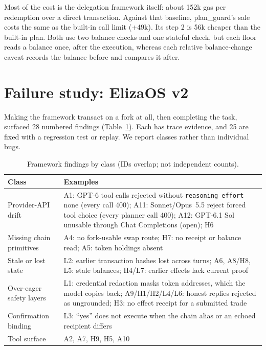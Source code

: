 \documentclass[conference]{IEEEtran}
\begin{document}
Most of the cost is the delegation framework itself: about 152k gas per redemption over a direct transaction. Against
that baseline, plan\_guard's sale costs the same as the built-in call limit (+49k). Its step 2 is 56k cheaper than
the built-in plan. Both use two balance checks and one stateful check, but each floor reads a balance once, after the
execution, whereas each relative balance-change caveat records the balance before and compares it after.

\section{Failure study: ElizaOS v2}\label{sec:failures}

Making the framework transact on a fork at all, then completing the task, surfaced 28 numbered findings
(Table~\ref{tab:defects}). Each has trace evidence, and 25 are fixed with a regression test or replay. We report
classes rather than individual bugs.

\begin{table}[t]
\centering
\caption{Framework findings by class (IDs overlap; not independent counts).}
\label{tab:defects}
\setlength{\tabcolsep}{3pt}
\begin{tabular}{p{2.6cm}p{5.3cm}}
\toprule
Class & Examples \\
\midrule
Provider-API drift & A1: GPT-6 tool calls rejected without \texttt{reasoning\_effort} none (every call 400); A11: Sonnet/Opus~5.5 reject forced tool choice (every planner call 400); A12: GPT-6.1 Sol unusable through Chat Completions (open); H6 \\
Missing chain primitives & A4: no fork-usable swap route; H7: no receipt or balance read; A5: token holdings absent \\
Stale or lost state & L2: earlier transaction hashes lost across turns; A6, A8/H8, L5: stale balances; H4/L7: earlier effects lack current proof \\
Over-eager safety layers & L1: credential redaction masks token addresses, which the model copies back; A9/H1/H2/L4/L6: honest replies rejected as ungrounded; H3: no effect receipt for a submitted trade \\
Confirmation binding & L3: ``yes'' does not execute when the chain alias or an echoed recipient differs \\
Tool surface & A2, A7, H9, H5, A10 \\
\bottomrule
\end{tabular}
\end{table}
\end{document}
